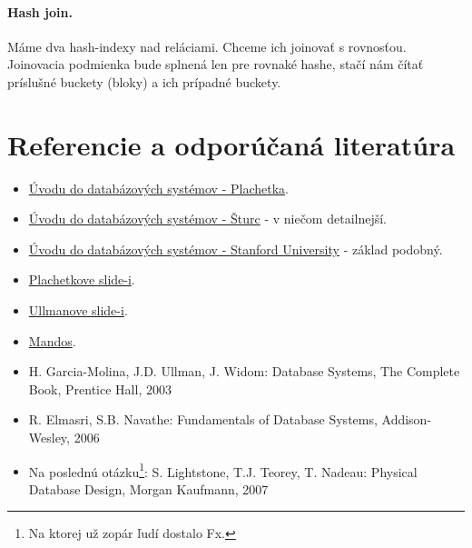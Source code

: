 \documentclass[10pt,a4paper]{article}
\begin{document}
\paragraph{Hash join.}
Máme dva hash-indexy nad reláciami. Chceme ich joinovať s rovnosťou. Joinovacia podmienka bude splnená len pre rovnaké hashe, stačí nám čítať príslušné buckety (bloky) a ich prípadné buckety.

\clearpage
\section*{Referencie a odporúčaná literatúra}
\begin{itemize}
\item \href{http://www.dcs.fmph.uniba.sk/~plachetk/TEACHING/DB2011/index.html}{Úvodu do databázových systémov - Plachetka}.
\item \href{http://www.dcs.fmph.uniba.sk/~sturc/databazy/uvod/}{Úvodu do databázových systémov - Šturc} - v niečom detailnejší.
\item \href{http://infolab.stanford.edu/~widom/cs145/}{Úvodu do databázových systémov - Stanford University} - základ podobný.


\item \href{http://csip.sk/uploads/plachetka\_uvod\_do\_databaz\_2011.pdf}{Plachetkove slide-i}.
\item \href{http://csip.sk/uploads/ullman.pdf}{Ullmanove slide-i}.
\item \href{http://fmfi-uk.hq.sk/Informatika/Uvod\%20Do\%20Databazovych\%20Systemov/prednasky/}{Mandos}.
\item H. Garcia-Molina, J.D. Ullman, J. Widom: Database Systems, The Complete Book, Prentice Hall, 2003
\item R. Elmasri, S.B. Navathe: Fundamentals of Database Systems, Addison-Wesley, 2006
\item Na poslednú otázku\footnote{
Na ktorej už zopár ľudí dostalo Fx.
}: S. Lightstone, T.J. Teorey, T. Nadeau: Physical Database Design, Morgan Kaufmann, 2007
\end{itemize}
\end{document}
